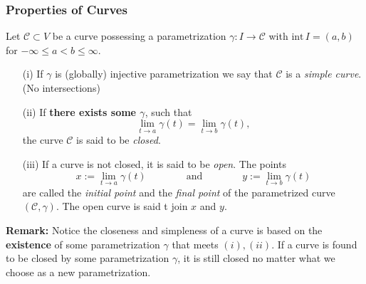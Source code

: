 \documentclass[12pt, t]{beamer}
\renewcommand{\emph}[1]{{\color{Turquoise3}\textsl{#1}}}
\newcommand{\Remark}{\textbf{Remark: }}
\begin{document}
\begin{frame}[allowframebreaks]
    \frametitle{Properties of Curves}
    Let $\mathcal{C}\subset V$ be a curve possessing a parametrization $\gamma:I\to\mathcal{C}$ with $\text{int}\,I=(a,b)$ for $-\infty\leq a<b\leq\infty$.
    \begin{itemize}
        \item[(i)] If $\gamma$ is (globally) injective parametrization we say that $\mathcal{C}$ is a \emph{simple curve}. (No intersections)
        \item[(ii)] If \textbf{there exists some $\gamma$}, such that
              \[\lim_{t\to a}\gamma(t)=\lim_{t\to b}\gamma(t),\]
              the curve $\mathcal{C}$ is said to be \emph{closed}.
        \item[(iii)] If a curve is not closed, it is said to be \emph{open}. The points
              \[x:=\lim_{t\to a}\gamma(t)\qquad\qquad\text{and}\qquad\qquad y:=\lim_{t\to b}\gamma(t)\]
              are called the \emph{initial point} and the \emph{final point} of the parametrized curve $(\mathcal{C},\gamma)$. The open curve is said t join $x$ and $y$.
    \end{itemize}
    \newpage
    \Remark Notice the closeness and simpleness of a curve is based on the \textbf{existence} of some parametrization $\gamma$ that meets $(i),(ii)$. If a curve is found to be closed by some parametrization $\gamma$, it is still closed no matter what we choose as a new parametrization.
\end{frame}
\end{document}
